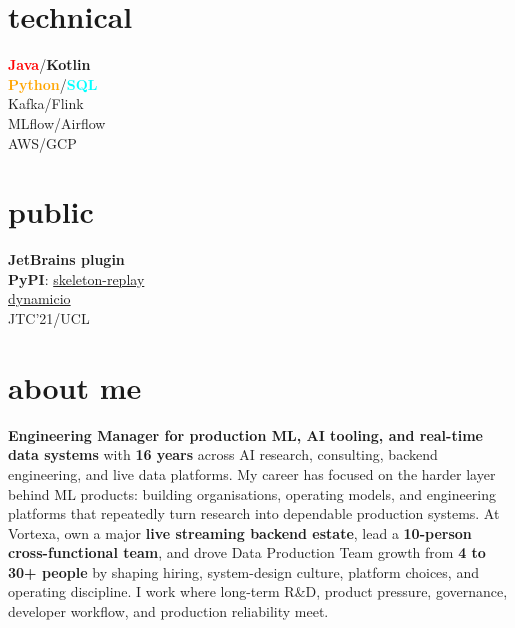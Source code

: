 \documentclass[]{../../friggeri-cv}
\begin{document}
\begin{aside}
			\section{technical}
			{\footnotesize \textbf{\textcolor{red}{Java}}/\textbf{\textcolor{red!50!black}{Kotlin}}\\\textbf{\textcolor{orange}{Python}}/\textbf{\textcolor{cyan}{SQL}}\\Kafka/Flink\\MLflow/Airflow\\AWS/GCP}
			\section{public}
			{\footnotesize \textbf{JetBrains plugin}\\\textbf{PyPI}: \href{https://pypi.org/project/skeleton-replay/}{skeleton-replay}\\\href{https://pypi.org/project/dynamicio/}{dynamicio}\\JTC'21/UCL}
	\end{aside}

\section{about me}
{\small \textbf{Engineering Manager for production ML, AI tooling, and real-time data systems} with \textbf{16 years} across AI research, consulting, backend engineering, and live data platforms. My career has focused on the harder layer behind ML products: building organisations, operating models, and engineering platforms that repeatedly turn research into dependable production systems. At Vortexa, own a major \textbf{live streaming backend estate}, lead a \textbf{10-person cross-functional team}, and drove Data Production Team growth from \textbf{4 to 30+ people} by shaping hiring, system-design culture, platform choices, and operating discipline. I work where long-term R\&D, product pressure, governance, developer workflow, and production reliability meet.}
\end{document}
